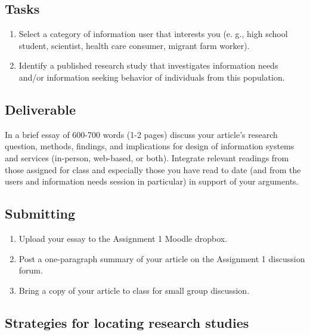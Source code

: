 \documentclass[]{article}
\providecommand{\tightlist}{%
  \setlength{\itemsep}{0pt}\setlength{\parskip}{0pt}}
\begin{document}
\subsection{Tasks}\label{tasks}

\begin{enumerate}
\def\labelenumi{\arabic{enumi}.}
\tightlist
\item
  Select a category of information user that interests you (e. g., high
  school student, scientist, health care consumer, migrant farm worker).
\item
  Identify a published research study that investigates information
  needs and/or information seeking behavior of individuals from this
  population.
\end{enumerate}

\subsection{Deliverable}\label{deliverable}

In a brief essay of 600-700 words (1-2 pages) discuss your article's
research question, methods, findings, and implications for design of
information systems and services (in-person, web-based, or both).
Integrate relevant readings from those assigned for class and especially
those you have read to date (and from the users and information needs
session in particular) in support of your arguments.

\subsection{Submitting}\label{submitting}

\begin{enumerate}
\def\labelenumi{\arabic{enumi}.}
\tightlist
\item
  Upload your essay to the Assignment 1 Moodle dropbox.
\item
  Post a one-paragraph summary of your article on the Assignment 1
  discussion forum.
\item
  Bring a copy of your article to class for small group discussion.
\end{enumerate}

\subsection{Strategies for locating research
studies}\label{strategies-for-locating-research-studies}
\end{document}
